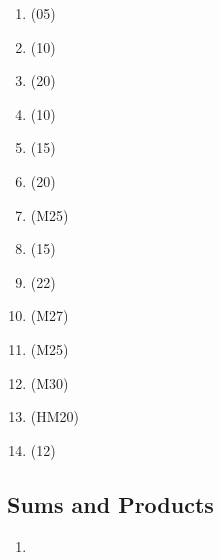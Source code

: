 \documentclass[Main.tex]{subfiles}
\begin{document}
\begin{enumerate}
        
    
    \item (05)
    
        
    
    \item (10)
    
        
    
    \item (20)
    
        
    
    \item (10)
    
        
    
    \item (15)
    
        
    
    \item (20)
    
        
    
    \item (M25)
    
        
    
    \item (15)
    
        
    
    \item (22)
    
        
    
    \item (M27)
    
        
    
    \item (M25)
    
        
    
    \item (M30)
    
        
    
    \item (HM20)
    
        
    
    \item (12)
\end{enumerate}

\subsection{Sums and Products}
\begin{enumerate}
    \item 
\end{enumerate}
\end{document}
